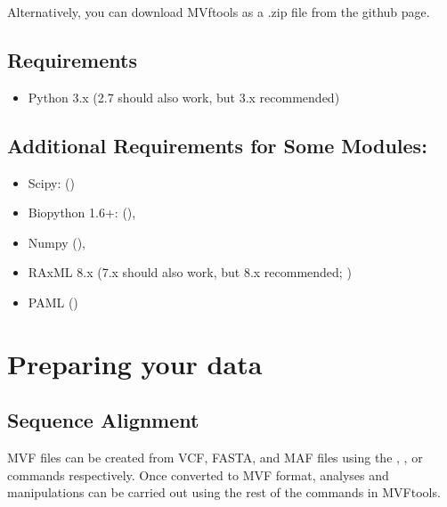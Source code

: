\documentclass[letterpaper,11pt,english]{sphinxmanual}
\begin{document}
Alternatively, you can download MVftools as a .zip file from the github page.


\subsection{Requirements}
\label{\detokenize{intro:requirements}}\begin{itemize}
\item {} 
Python 3.x (2.7 should also work, but 3.x recommended) 

\end{itemize}


\subsection{Additional Requirements for Some Modules:}
\label{\detokenize{intro:additional-requirements-for-some-modules}}\begin{itemize}
\item {} 
Scipy: ()

\item {} 
Biopython 1.6+: (),

\item {} 
Numpy (),

\item {} 
RAxML 8.x (7.x should also work, but 8.x recommended; )

\item {} 
PAML ()

\end{itemize}


\section{Preparing your data}
\label{\detokenize{intro:preparing-your-data}}

\subsection{Sequence Alignment}
\label{\detokenize{intro:sequence-alignment}}
MVF files can be created from VCF, FASTA, and MAF files using the , , or  commands respectively.  Once converted to MVF format, analyses and manipulations can be carried out using the rest of the commands in MVFtools.
\end{document}
